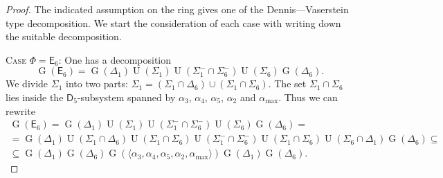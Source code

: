 \documentclass[oneside, 12pt]{amsart}
\theoremstyle{plain}
\numberwithin{equation}{section}
\numberwithin{lemma}{section}
\theoremstyle{definition}
\theoremstyle{remark}
\DeclareMathOperator{\G}{G}
\DeclareMathOperator{\U}{U}
\newcommand{\rD}{\mathsf{D}}
\newcommand{\rE}{\mathsf{E}}
\begin{document}
\begin{proof}
The indicated assumption on the ring gives one of the Dennis---Vaserstein type decomposition. We start the consideration of each case with writing down the suitable decomposition.

\textsc{Case $\Phi=\rE_6$:} One has a decomposition
\[ \G(\rE_6) = \G(\Delta_1)\U(\Sigma_1)\U(\Sigma_1^-\cap\Sigma_6^-)\U(\Sigma_6)\G(\Delta_6). \]
We divide $\Sigma_1$ into two parts: $\Sigma_1=(\Sigma_1\cap\Delta_6)\cup(\Sigma_1\cap\Sigma_6)$. The set $\Sigma_1\cap\Sigma_6$ lies inside the $\rD_5$-subsystem spanned by $\alpha_3$, $\alpha_4$, $\alpha_5$, $\alpha_2$ and $\alpha_{\max}$. Thus we can rewrite
\begin{multline*}
\G(\rE_6) = \G(\Delta_1) \U(\Sigma_1) \U(\Sigma_1^-\cap\Sigma_6^-) \U(\Sigma_6) \G(\Delta_6) = \\
= \G(\Delta_1) \U(\Sigma_1\cap\Delta_6) \U(\Sigma_1\cap\Sigma_6) \U(\Sigma_1^-\cap\Sigma_6^-) \U(\Sigma_1\cap\Sigma_6) \U(\Sigma_6\cap\Delta_1) \G(\Delta_6) \subseteq \\
\subseteq \G(\Delta_1) \G(\Delta_6) \G(\langle\alpha_3, \alpha_4, \alpha_5, \alpha_2, \alpha_{\max}\rangle) \G(\Delta_1) \G(\Delta_6).
\end{multline*}


\end{proof}
\end{document}
